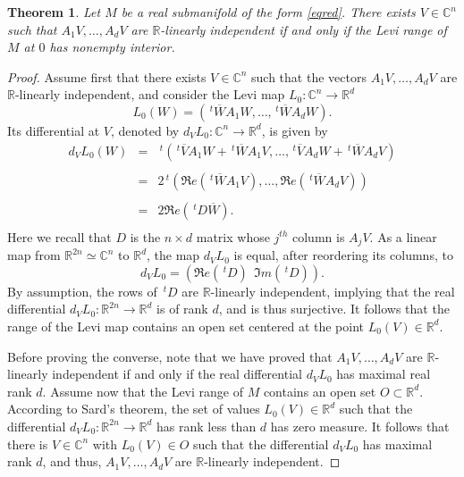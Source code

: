 \documentclass[10pt,a4paper]{amsart}
\newcommand{\C}{\mathbb C}
\newcommand{\R}{\mathbb R}
\newcommand{\transp}{\,^t}
\newtheorem{theo}{Theorem}[section]
\numberwithin{equation}{section}
\begin{document}
\begin{theo}\label{theorange}
Let  $M$ be a  real submanifold of the form \eqref{eqred}. There exists $V \in \C^n$ such that $A_1V,\ldots,A_dV$ are $\R$-linearly independent if and only if the Levi range of $M$ at $0$ has nonempty interior. 
\end{theo}
\begin{proof}
Assume first that there exists $V \in \C^n$ such that the vectors $A_1V,\ldots,A_dV$ are $\R$-linearly independent, and consider the Levi map $L_0: \C^n \to \R^d$
$$L_0(W)=\left(\transp \overline{W}A_1W,\ldots,\transp \overline{W}A_dW\right).$$
Its differential at $V$, denoted by $d_VL_0: \C^n \to \R^d$, is given by 
\begin{eqnarray*}
d_VL_0(W)&=&\transp\left(\transp \overline{V}A_1W+\transp \overline{W}A_1V,\ldots,\transp \overline{V}A_dW+\transp \overline{W}A_dV\right)\\
\\
& =& 2\transp\left(\Re e (\transp \overline{W}A_1V),\ldots,\Re e (\transp \overline{W}A_dV)\right)\\
\\
& =& 2 \Re e \left(\transp D \overline{W}\right).\\
\end{eqnarray*}
Here we recall that $D$ is the $n \times d$ matrix whose $j^{th}$ column is $A_jV$.  
As a linear map from $\R^{2n}\simeq \C^n$ to $\R^d$, the map $d_VL_0$ is equal, after reordering its columns, to 
$$d_VL_0=(\Re e (\transp D) \ \ \Im m  (\transp D)).$$
By assumption, the rows of $\transp D$ are $\R$-linearly independent, implying that the real differential $d_VL_0: \R^{2n} \to \R^d$ is of rank $d$, and is thus surjective.
It follows that the range of the Levi map contains an open set centered at the point $L_0(V) \in \R^d$. 

Before proving the converse, note that we have proved that $A_1V,\ldots,A_dV$ are $\R$-linearly independent if and only if the real differential $d_VL_0$ has maximal real rank $d$.  Assume now that the Levi range of $M$ contains an open set $O \subset \R^d$. According to Sard's theorem, the set of values $L_0(V)\in \R^d$ such that the differential $d_VL_0:\R^{2n}\to \R^d$ has rank less than $d$ has zero measure. It follows that there is $V \in \C^n$ with $L_0(V) \in O$ such that the differential  $d_VL_0$ has maximal rank $d$, and thus, $A_1V,\ldots,A_dV$ are $\R$-linearly independent. 
\end{proof}
\end{document}
